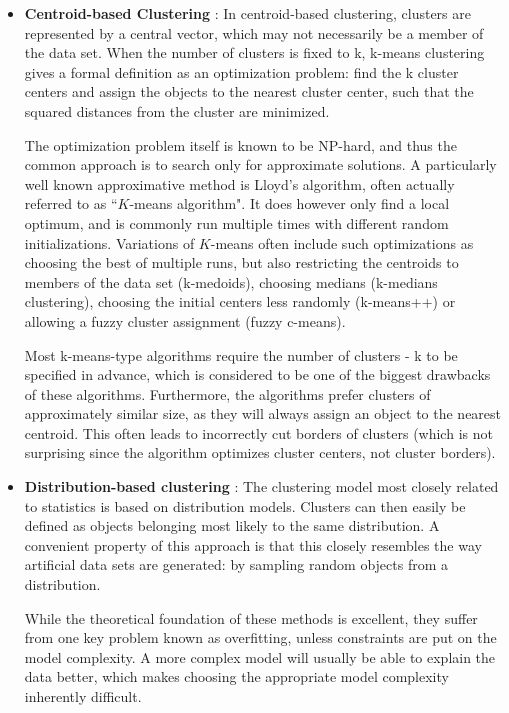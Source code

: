 \begin{itemize}
\item \textbf{Centroid-based Clustering} : In centroid-based clustering, clusters are represented by a central vector,
which may not necessarily be a member of the data set. When the number of clusters is fixed to k, k-means clustering
gives a formal definition as an optimization problem: find the k cluster centers and assign the objects to the nearest
cluster center, such that the squared distances from the cluster are minimized.

The optimization problem itself is known to be NP-hard, and thus the common approach is to search only for approximate
solutions. A particularly well known approximative method is Lloyd's algorithm, often actually referred to as
``$K$-means algorithm". It does however only find a local optimum, and is commonly run multiple times with different
random initializations. Variations of $K$-means often include such optimizations as choosing the best of multiple runs,
but also restricting the centroids to members of the data set (k-medoids), choosing medians (k-medians clustering),
choosing the initial centers less randomly (k-means++) or allowing a fuzzy cluster assignment (fuzzy c-means).

Most k-means-type algorithms require the number of clusters - k to be specified in advance, which is considered
to be one of the biggest drawbacks of these algorithms. Furthermore, the algorithms prefer clusters of approximately
similar size, as they will always assign an object to the nearest centroid. This often leads to incorrectly cut
borders of clusters (which is not surprising since the algorithm optimizes cluster centers, not cluster borders).

\item \textbf{Distribution-based clustering} : The clustering model most closely related to statistics is based
on distribution models. Clusters can then easily be defined as objects belonging most likely to the same distribution.
A convenient property of this approach is that this closely resembles the way artificial data sets are generated:
by sampling random objects from a distribution.

While the theoretical foundation of these methods is excellent, they suffer from one key problem known as overfitting,
unless constraints are put on the model complexity. A more complex model will usually be able to explain the data better,
which makes choosing the appropriate model complexity inherently difficult.


\end{itemize}
